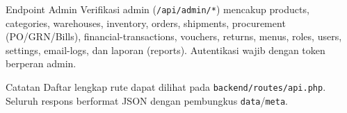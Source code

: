 \begin{flowsection}{Endpoint Admin}
Verifikasi admin (\texttt{/api/admin/*}) mencakup products, categories,
warehouses, inventory, orders, shipments, procurement (PO/GRN/Bills),
financial-transactions, vouchers, returns, menus, roles, users, settings,
email-logs, dan laporan (reports). Autentikasi wajib dengan token berperan admin.
\end{flowsection}

\begin{flowsection}{Catatan}
Daftar lengkap rute dapat dilihat pada \texttt{backend/routes/api.php}. Seluruh
respons berformat JSON dengan pembungkus \texttt{data}/\texttt{meta}.
\end{flowsection}

